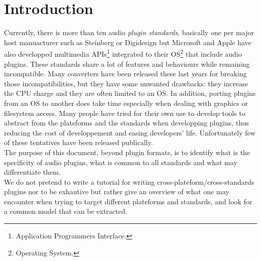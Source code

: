 
\chapter{Introduction}
\noindent Currently, there is more than ten audio \textit{plugin standards}, basically one per major host manuacturer such as Steinberg or Digidesign but Microsoft and Apple have also developped multimedia APIs\footnote{Application Programmers Interface.} integrated to their OS\footnote{Operating System.} that include audio plugins. These standards share a lot of features and behaviours while remaining incompatible. Many converters have been released these last years for breaking those incompatibilities, but they have some unwanted drawbacks: they increase the CPU charge and they are often limited to an OS. In addition, porting plugins from an OS to another does take time especially when dealing with graphics or filesystem access. Many people have tried for their own use to develop tools to abstract from the plateforms and the standards when developping plugins, thus reducing the cost of developpement and easing developers' life. Unfortunately few of these tentatives have been released publically.\\

\noindent The purpose of this document, beyond plugin formats, is to identify what is the specificity of audio plugins, what is common to all standards and what may differentiate them.\\

\noindent We do not pretend to write a tutorial for writing cross-plateform/cross-standards plugins nor to be exhautive but rather give an overview of what one may encounter when trying to target different plateforms and standards, and look for a common model that can be extracted.

